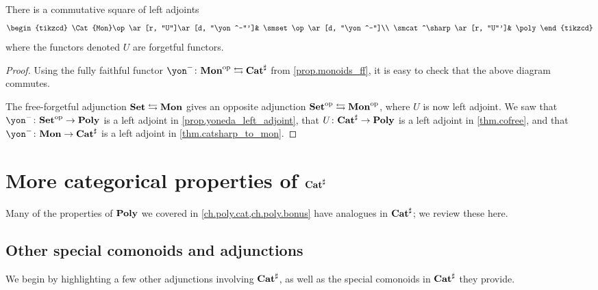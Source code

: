 \documentclass[Book-Poly]{subfiles}
\begin{document}
\begin{proposition}\label{prop.traj_mon_poly}
There is a commutative square of left adjoints
\[
\begin{tikzcd}
	\Cat{Mon}\op\ar[r, "U"]\ar[d, "\yon^-"']&
	\smset\op\ar[d, "\yon^-"]\\
	\smcat^\sharp\ar[r, "U"']&
	\poly
\end{tikzcd}
\]
where the functors denoted $U$ are forgetful functors.
\end{proposition}
\begin{proof}
Using the fully faithful functor $\yon^-\colon\Cat{Mon}\op\fromto\smcat^\sharp$ from \cref{prop.monoids_ff}, it is easy to check that the above diagram commutes.

The free-forgetful adjunction $\mathbf{Set}\leftrightarrows\mathbf{Mon}$ gives an opposite adjunction $\mathbf{Set}^{\textnormal{op}}\leftrightarrows\mathbf{Mon}^{\textnormal{op}}$, where $U$ is now left adjoint. We saw that $\yon^-\colon\smset\op\to\poly$ is a left adjoint in \cref{prop.yoneda_left_adjoint}, that $U\colon\mathbf{Cat}^\sharp\to\mathbf{Poly}$ is a left adjoint in \cref{thm.cofree}, and that $\yon^-\colon\Cat{Mon}\to\smcat^\sharp$ is a left adjoint in \cref{thm.catsharp_to_mon}.
\end{proof}

\section{More categorical properties of $\mathbf{Cat}^\sharp$}

Many of the properties of $\mathbf{Poly}$ we covered in \cref{ch.poly.cat,ch.poly.bonus} have analogues in $\mathbf{Cat}^\sharp$; we review these here.

\subsection{Other special comonoids and adjunctions}

We begin by highlighting a few other adjunctions involving $\mathbf{Cat}^\sharp$, as well as the special comonoids in $\mathbf{Cat}^\sharp$ they provide.
\end{document}

